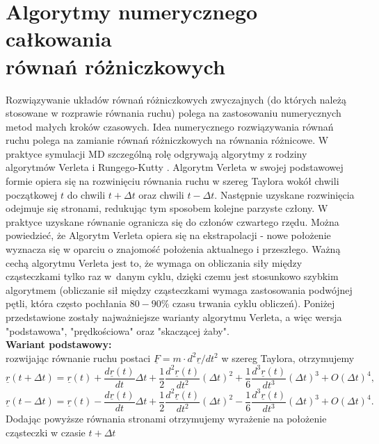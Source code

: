 \documentclass[12pt,a4paper,openright]{report} %
\begin{document}
\section{Algorytmy numerycznego całkowania \\ równań różniczkowych}
\label{algolnum}
Rozwiązywanie układów równań różniczkowych zwyczajnych (do których należą stosowane w rozprawie równania ruchu) polega na zastosowaniu numerycznych metod małych kroków czasowych. Idea numerycznego rozwiązywania równań ruchu polega na zamianie równań różniczkowych na równania różnicowe. W praktyce symulacji MD szczególną rolę odgrywają algorytmy z rodziny algorytmów Verleta \cite{Verlet1, Verlet2} i Rungego-Kutty \cite{AllenTildesley}. Algorytm Verleta w swojej podstawowej formie opiera się na rozwinięciu równania ruchu w szereg Taylora wokół chwili początkowej $t$ do chwili $t+\Delta t$ oraz chwili $t-\Delta t$. Następnie uzyskane rozwinięcia odejmuje się stronami, redukując tym sposobem kolejne parzyste człony. W praktyce uzyskane równanie ogranicza się do członów czwartego rzędu. Można powiedzieć, że Algorytm Verleta opiera się na ekstrapolacji - nowe położenie wyznacza się w oparciu o znajomość położenia aktualnego i przeszłego. Ważną cechą algorytmu Verleta jest to, że wymaga on obliczania siły między cząsteczkami tylko raz w~danym cyklu, dzięki czemu jest stosunkowo szybkim algorytmem (obliczanie sił między cząsteczkami wymaga zastosowania podwójnej pętli, która często pochłania $80-90 \%$ czasu trwania cyklu obliczeń). Poniżej przedstawione zostały najważniejsze warianty algorytmu Verleta, a więc wersja "podstawowa", "prędkościowa" oraz "skaczącej żaby".\\
\textbf{Wariant podstawowy:}\\
rozwijając równanie ruchu postaci $\underline{F}=m \cdot d^2 \underline{r} / dt^2$ w szereg Taylora, otrzymujemy
\begin{equation}
\underline{r}(t+\Delta t) = \underline{r}(t)+ \frac{d \underline{r}(t)}{dt} \Delta t + \frac{1}{2} \frac{d^2 \underline{r}(t)}{dt^2} (\Delta t)^2 + \frac{1}{6} \frac{d^3 \underline{r}(t)}{dt^3} (\Delta t)^3 + O(\Delta t)^4,
\end{equation}
\begin{equation}
\underline{r}(t-\Delta t) = \underline{r}(t) - \frac{d \underline{r}(t)}{dt} \Delta t + \frac{1}{2} \frac{d^2 \underline{r}(t)}{dt^2} (\Delta t)^2 - \frac{1}{6} \frac{d^3 \underline{r}(t)}{dt^3} (\Delta t)^3 + O(\Delta t)^4.
\end{equation}
Dodając powyższe równania stronami otrzymujemy wyrażenie na położenie cząsteczki w czasie $t+\Delta t$
\end{document}
